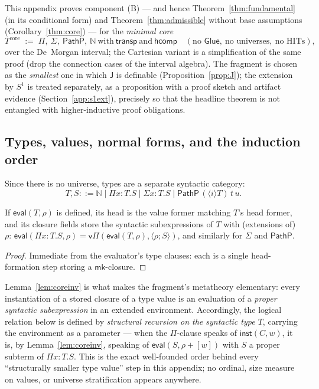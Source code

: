 \documentclass{lmcs}
\newcommand{\transp}{\mathsf{transp}}
\newcommand{\hcomp}{\mathsf{hcomp}}
\newcommand{\J}{\mathsf{J}}
\newcommand{\Glue}{\mathsf{Glue}}
\newcommand{\evalop}{\mathsf{eval}}
\newcommand{\capp}{\mathsf{inst}}
\begin{document}
This appendix proves component (B) --- and hence
Theorem~\ref{thm:fundamental} (in its conditional form) and
Theorem~\ref{thm:admissible} without base assumptions
(Corollary~\ref{thm:core}) --- for the \emph{minimal core}
\[
  T^{\mathrm{core}} \;:=\;
  \Pi,\ \Sigma,\ \mathsf{PathP},\ \mathbb{N}
  \ \text{with}\ \transp\ \text{and}\ \hcomp
  \quad(\text{no } \Glue,\ \text{no universes},\ \text{no HITs}),
\]
over the De~Morgan interval; the Cartesian variant is a
simplification of the same proof (drop the connection cases of the
interval algebra).  The fragment is chosen as the \emph{smallest}
one in which $\J$ is definable (Proposition~\ref{prop:J}); the
extension by $S^1$ is treated separately, as a proposition with a
proof sketch and artifact evidence
(Section~\ref{app:s1ext}), precisely so that the headline theorem
is not entangled with higher-inductive proof obligations.

\subsection{Types, values, normal forms, and the induction order}
\label{app:coretypes}

Since there is no universe, types are a separate syntactic
category:
\[
  T, S ::= \mathbb{N} \mid \Pi x{:}T.S \mid \Sigma x{:}T.S \mid
  \mathsf{PathP}\,(\langle i \rangle T)\,t\,u .
\]

\begin{lem}\label{lem:coreinv}
  If $\evalop(T, \rho)$ is defined, its head is the value former
  matching $T$'s head former, and its closure fields store the
  syntactic subexpressions of $T$ with (extensions of) $\rho$:
  $\evalop(\Pi x{:}T.S, \rho) = \mathsf{v}\Pi(\evalop(T,\rho),
  \langle \rho; S \rangle)$, and similarly for $\Sigma$ and
  $\mathsf{PathP}$.
\end{lem}
\begin{proof}
  Immediate from the evaluator's type clauses: each is a single
  head-formation step storing a $\mathsf{mk}$-closure.
\end{proof}

\begin{rem}\label{rem:order}
  Lemma~\ref{lem:coreinv} is what makes the fragment's metatheory
  elementary: every instantiation of a stored closure of a type
  value is an evaluation of a \emph{proper syntactic subexpression}
  in an extended environment.  Accordingly, the logical relation
  below is defined by \emph{structural recursion on the syntactic
  type $T$}, carrying the environment as a parameter --- when the
  $\Pi$-clause speaks of $\capp(C, w)$, it is, by
  Lemma~\ref{lem:coreinv}, speaking of $\evalop(S, \rho{+}[w])$
  with $S$ a proper subterm of $\Pi x{:}T.S$.  This is the exact
  well-founded order behind every ``structurally smaller type
  value'' step in this appendix; no ordinal, size measure on
  values, or universe stratification appears anywhere.
\end{rem}
\end{document}
